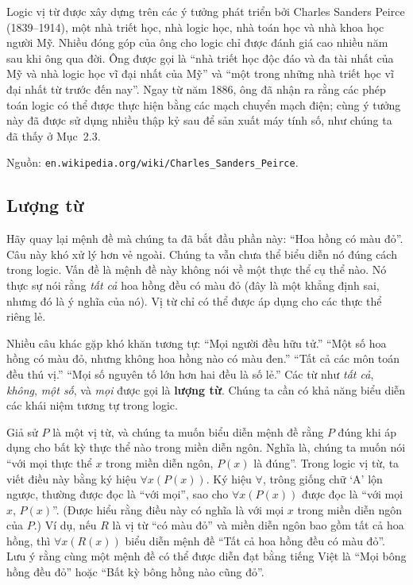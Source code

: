 \begin{infobox}
Logic vị từ được xây dựng trên các ý tưởng phát triển bởi Charles Sanders Peirce (1839--1914), một nhà triết học, nhà logic học, nhà toán học và nhà khoa học người Mỹ. Nhiều đóng góp của ông cho logic chỉ được đánh giá cao nhiều năm sau khi ông qua đời. Ông được gọi là ``nhà triết học độc đáo và đa tài nhất của Mỹ và nhà logic học vĩ đại nhất của Mỹ'' và ``một trong những nhà triết học vĩ đại nhất từ trước đến nay''. Ngay từ năm 1886, ông đã nhận ra rằng các phép toán logic có thể được thực hiện bằng các mạch chuyển mạch điện; cùng ý tưởng này đã được sử dụng nhiều thập kỷ sau để sản xuất máy tính số, như chúng ta đã thấy ở Mục~2.3.

Nguồn: \texttt{en.wikipedia.org/wiki/Charles\_Sanders\_Peirce}.
\end{infobox}

\subsection{Lượng từ}

Hãy quay lại mệnh đề mà chúng ta đã bắt đầu phần này: ``Hoa hồng có màu đỏ''. Câu này khó xử lý hơn vẻ ngoài. Chúng ta vẫn chưa thể biểu diễn nó đúng cách trong logic. Vấn đề là mệnh đề này không nói về một thực thể cụ thể nào. Nó thực sự nói rằng \textit{tất cả} hoa hồng đều có màu đỏ (đây là một khẳng định sai, nhưng đó là ý nghĩa của nó). Vị từ chỉ có thể được áp dụng cho các thực thể riêng lẻ.

Nhiều câu khác gặp khó khăn tương tự: ``Mọi người đều hữu tử.'' ``Một số hoa hồng có màu đỏ, nhưng không hoa hồng nào có màu đen.'' ``Tất cả các môn toán đều thú vị.'' ``Mọi số nguyên tố lớn hơn hai đều là số lẻ.'' Các từ như \textit{tất cả}, \textit{không}, \textit{một số}, và \textit{mọi} được gọi là \textbf{lượng từ}. Chúng ta cần có khả năng biểu diễn các khái niệm tương tự trong logic.

Giả sử $P$ là một vị từ, và chúng ta muốn biểu diễn mệnh đề rằng $P$ đúng khi áp dụng cho bất kỳ thực thể nào trong miền diễn ngôn. Nghĩa là, chúng ta muốn nói ``với mọi thực thể $x$ trong miền diễn ngôn, $P(x)$ là đúng''. Trong logic vị từ, ta viết điều này bằng ký hiệu $\forall x(P(x))$. Ký hiệu $\forall$, trông giống chữ `A' lộn ngược, thường được đọc là ``với mọi'', sao cho $\forall x(P(x))$ được đọc là ``với mọi $x$, $P(x)$''. (Được hiểu rằng điều này có nghĩa là với mọi $x$ trong miền diễn ngôn của $P$.) Ví dụ, nếu $R$ là vị từ ``có màu đỏ'' và miền diễn ngôn bao gồm tất cả hoa hồng, thì $\forall x(R(x))$ biểu diễn mệnh đề ``Tất cả hoa hồng đều có màu đỏ''. Lưu ý rằng cùng một mệnh đề có thể được diễn đạt bằng tiếng Việt là ``Mọi bông hồng đều đỏ'' hoặc ``Bất kỳ bông hồng nào cũng đỏ''.

